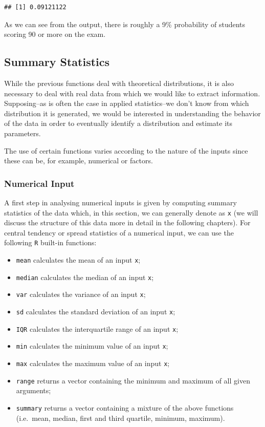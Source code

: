 \documentclass[12pt,]{krantz}
\providecommand{\tightlist}{%
  \setlength{\itemsep}{0pt}\setlength{\parskip}{0pt}}
\begin{document}
\begin{verbatim}
## [1] 0.09121122
\end{verbatim}

As we can see from the output, there is roughly a 9\% probability of
students scoring 90 or more on the exam.

\subsection{Summary Statistics}\label{summary-statistics}

While the previous functions deal with theoretical distributions, it is
also necessary to deal with real data from which we would like to
extract information. Supposing--as is often the case in applied
statistics--we don't know from which distribution it is generated, we
would be interested in understanding the behavior of the data in order
to eventually identify a distribution and estimate its parameters.

The use of certain functions varies according to the nature of the
inputs since these can be, for example, numerical or factors.

\subsubsection{Numerical Input}\label{numerical-input}

A first step in analysing numerical inputs is given by computing summary
statistics of the data which, in this section, we can generally denote
as \texttt{x} (we will discuss the structure of this data more in detail
in the following chapters). For central tendency or spread statistics of
a numerical input, we can use the following \texttt{R} built-in
functions:

\begin{itemize}
\tightlist
\item
  \texttt{mean} calculates the mean of an input \texttt{x};
\item
  \texttt{median} calculates the median of an input \texttt{x};
\item
  \texttt{var} calculates the variance of an input \texttt{x};
\item
  \texttt{sd} calculates the standard deviation of an input \texttt{x};
\item
  \texttt{IQR} calculates the interquartile range of an input
  \texttt{x};
\item
  \texttt{min} calculates the minimum value of an input \texttt{x};
\item
  \texttt{max} calculates the maximum value of an input \texttt{x};
\item
  \texttt{range} returns a vector containing the minimum and maximum of
  all given arguments;
\item
  \texttt{summary} returns a vector containing a mixture of the above
  functions (i.e.~mean, median, first and third quartile, minimum,
  maximum).
\end{itemize}
\end{document}

